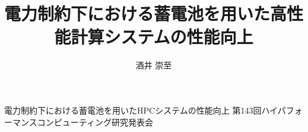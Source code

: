 \documentclass[ipc]{suribt}
\title{電力制約下における蓄電池を用いた高性能計算システムの性能向上}
\author{酒井 崇至}
\begin{document}
\maketitle%

\frontmatter%
\begin{abstract}%

\end{abstract}

\tableofcontents%

\mainmatter%










\backmatter%


\begin{thepublication}{9}
電力制約下における蓄電池を用いたHPCシステムの性能向上 第143回ハイパフォーマンスコンピューティング研究発表会
\end{thepublication}

\appendix%
\chapter{}
\end{document}
